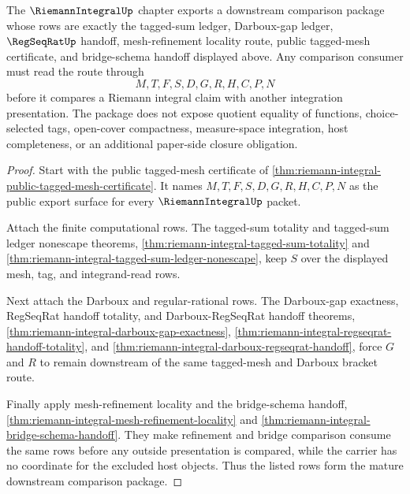 \begin{theorem}
\label{thm:riemannintegral-mature-package}
The $\RiemannIntegralUp$ chapter exports a downstream comparison package whose rows are exactly the tagged-sum ledger, Darboux-gap ledger, $\RegSeqRatUp$ handoff, mesh-refinement locality route, public tagged-mesh certificate, and bridge-schema handoff displayed above. Any comparison consumer must read the route through
$$
M,T,F,S,D,G,R,H,C,P,N
$$
before it compares a Riemann integral claim with another integration presentation. The package does not expose quotient equality of functions, choice-selected tags, open-cover compactness, measure-space integration, host completeness, or an additional paper-side closure obligation.
\end{theorem}
\begin{proof}
Start with the public tagged-mesh certificate of \autoref{thm:riemann-integral-public-tagged-mesh-certificate}. It names $M,T,F,S,D,G,R,H,C,P,N$ as the public export surface for every $\RiemannIntegralUp$ packet.

Attach the finite computational rows. The tagged-sum totality and tagged-sum ledger nonescape theorems, \autoref{thm:riemann-integral-tagged-sum-totality} and \autoref{thm:riemann-integral-tagged-sum-ledger-nonescape}, keep $S$ over the displayed mesh, tag, and integrand-read rows.

Next attach the Darboux and regular-rational rows. The Darboux-gap exactness, RegSeqRat handoff totality, and Darboux-RegSeqRat handoff theorems, \autoref{thm:riemann-integral-darboux-gap-exactness}, \autoref{thm:riemann-integral-regseqrat-handoff-totality}, and \autoref{thm:riemann-integral-darboux-regseqrat-handoff}, force $G$ and $R$ to remain downstream of the same tagged-mesh and Darboux bracket route.

Finally apply mesh-refinement locality and the bridge-schema handoff, \autoref{thm:riemann-integral-mesh-refinement-locality} and \autoref{thm:riemann-integral-bridge-schema-handoff}. They make refinement and bridge comparison consume the same rows before any outside presentation is compared, while the carrier has no coordinate for the excluded host objects. Thus the listed rows form the mature downstream comparison package.
\end{proof}


